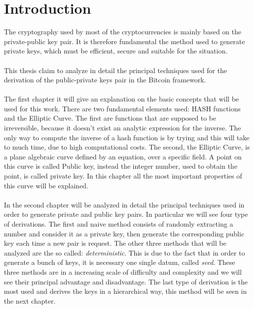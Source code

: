 
\chapter*{Introduction} %
\label{Introduction} %


The cryptography used by most of the cryptocurrencies is mainly based on the
private-public key pair. It is therefore fundamental the method used to generate
private keys, which must be efficient, secure and suitable for the situation.
\\ \\
This thesis claim to analyze in detail the principal techniques used for the derivation of the public-private keys pair in the Bitcoin framework.
\\ \\
The first chapter it will give an explanation on the basic concepts that will be used for this work.
There are two fundamental elements used: HASH functions and the Elliptic Curve. The first are functions that are supposed to be irreversible, because it doesn't exist an analytic expression for the inverse. The only way to compute the inverse of a hash function is by trying and this will take to much time, due to high computational costs.
The second, the Elliptic Curve, is a plane algebraic curve defined by an equation, over a specific field. A point on this curve is called Public key, instead the integer number, used to obtain the point, is called private key. In this chapter all the most important properties of this curve will be explained.
\\ \\
In the second chapter will be analyzed in detail the principal techniques used in order to generate private and public key pairs. In particular we will see four type of derivations. The first and naive method consists of randomly extracting a number and consider it as a private key, then generate the corresponding public key each time a new pair is request. The other three methods that will be analyzed are the so called: \textit{deterministic}. This is due to the fact that in order to generate a bunch of keys, it is necessary one single datum, called \textit{seed}. These three methods are in a increasing scale of difficulty and complexity and we will see their principal advantage and disadvantage. The last type of derivation is the most used and derives the keys in a hierarchical way, this method will be seen in the next chapter.

